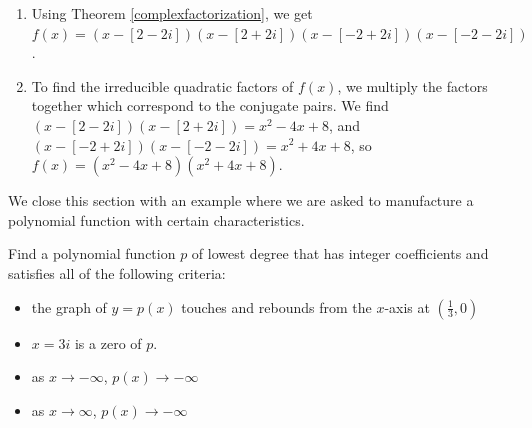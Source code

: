 \documentclass{ximera}
\begin{document}
\begin{exampleSol}
\begin{enumerate}
        \item  Using Theorem \ref{complexfactorization}, we get $f(x) = (x-[2-2i])(x-[2+2i])(x-[-2+2i])(x-[-2-2i])$.
        
        \item  To find the irreducible quadratic factors of $f(x)$, we multiply the factors together which correspond to the conjugate pairs.  We find $(x-[2-2i])(x-[2+2i]) = x^2-4x+8$, and $(x-[-2+2i])(x-[-2-2i]) = x^2+4x+8$, so  $f(x) =  \left(x^2-4x+8\right) \left(x^2+4x+8\right)$.   
    \end{enumerate}
\end{exampleSol}

We close this section with an example where we are asked to manufacture a polynomial function with certain characteristics.

\begin{example}  
    Find a polynomial function $p$ of lowest degree that has integer coefficients and satisfies all of the following criteria:
    \begin{itemize}
        \item  the graph of $y=p(x)$ touches and rebounds from the $x$-axis at $\left(\frac{1}{3}, 0\right)$
        \item  $x=3i$ is a zero of $p$.
        \item  as $x \rightarrow -\infty$, $p(x) \rightarrow -\infty$
        \item  as $x \rightarrow \infty$, $p(x) \rightarrow -\infty$
    \end{itemize}
\end{example}
\end{document}
